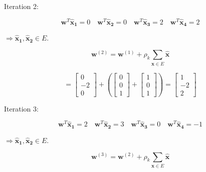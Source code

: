 \documentclass[fleqn]{article}
\begin{document}
\begin{enumerate}
		Iteration 2:
		
		\begin{equation*}
			\mathbf{w}^T\mathbf{\hat{x}_1} = 0 \quad \mathbf{w}^T\mathbf{\hat{x}_2} = 0 \quad \mathbf{w}^T\mathbf{\hat{x}_3} = 2 \quad \mathbf{w}^T\mathbf{\hat{x}_4} = 2
		\end{equation*}
		
		$\Rightarrow \mathbf{\hat{x}_1}, \mathbf{\hat{x}_2} \in E$.
		
		\begin{equation*}
			\mathbf{w}^{(2)} = \mathbf{w}^{(1)} + \rho_k\sum_{\mathbf{\hat{x}} \in E}{\mathbf{\hat{x}}}
		\end{equation*}
			
		\begin{equation*}
			= \begin{bmatrix} 0 \\ -2 \\ 0 \end{bmatrix}			 + \left(\begin{bmatrix}0\\0\\1\end{bmatrix} + \begin{bmatrix}1\\0\\1\end{bmatrix}\right) = \begin{bmatrix}1\\-2\\2\end{bmatrix}
		\end{equation*}
		
		Iteration 3:
		
		\begin{equation*}
			\mathbf{w}^T\mathbf{\hat{x}_1} = 2 \quad \mathbf{w}^T\mathbf{\hat{x}_2} = 3 \quad \mathbf{w}^T\mathbf{\hat{x}_3} = 0 \quad \mathbf{w}^T\mathbf{\hat{x}_4} = -1
		\end{equation*}
		
		$\Rightarrow \mathbf{\hat{x}_1}, \mathbf{\hat{x}_2} \in E$.
		
		\begin{equation*}
			\mathbf{w}^{(3)} = \mathbf{w}^{(2)} + \rho_k\sum_{\mathbf{\hat{x}} \in E}{\mathbf{\hat{x}}}
		\end{equation*}
			

\end{enumerate}
\end{document}
